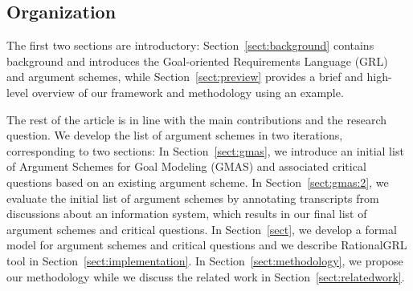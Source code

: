 \subsection{Organization}

The first two sections are introductory: Section~\ref{sect:background} contains background and introduces the Goal-oriented Requirements Language (GRL)~\cite{} and argument schemes, while Section~\ref{sect:preview} provides a brief and high-level overview of our framework and methodology using an example. 

The rest of the article is in line with the main contributions and the research question. We develop the list of argument schemes in two iterations, corresponding to two sections: In Section~\ref{sect:gmas}, we introduce an initial list of Argument Schemes for Goal Modeling (GMAS) and associated critical questions based on an existing argument scheme. In Section~\ref{sect:gmas:2}, we evaluate the initial list of argument schemes by annotating transcripts from discussions about an information system, which results in our final list of argument schemes and critical questions. In Section~\ref{sect}, we develop a formal model for argument schemes and critical questions and we describe RationalGRL tool in Section~\ref{sect:implementation}. In Section~\ref{sect:methodology}, we propose our methodology while we discuss the related work in Section~\ref{sect:relatedwork}.